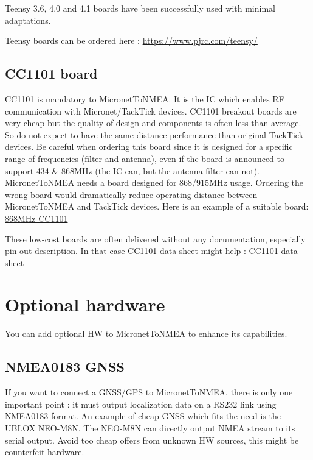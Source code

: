 \documentclass{report}
\begin{document}
Teensy 3.6, 4.0 and 4.1 boards have been successfully used with minimal adaptations.

Teensy boards can be ordered here : \url{https://www.pjrc.com/teensy/}

\subsection{CC1101 board}

CC1101 is mandatory to MicronetToNMEA. It is the IC which enables RF communication with Micronet/TackTick devices. CC1101 breakout boards are very cheap but the quality of design and components is often less than average. So do not expect to have the same distance performance than original TackTick devices. Be careful when ordering this board since it is designed for a specific range of frequencies (filter and antenna), even if the board is announced to support 434 \& 868MHz (the IC can, but the antenna filter can not). MicronetToNMEA needs a board designed for 868/915MHz usage. Ordering the wrong board would dramatically reduce operating distance between MicronetToNMEA and TackTick devices. Here is an example of a suitable board: \href{https://www.amazon.fr/laqiya-cc1101-868-MHz-Transmission-Antenne-Transceiver/dp/B075PFQ57G}{868MHz CC1101}

These low-cost boards are often delivered without any documentation, especially pin-out description. In that case CC1101 data-sheet might help : \href{https://www.ti.com/lit/ds/symlink/cc1101.pdf}{CC1101 data-sheet}

\section{Optional hardware}

You can add optional HW to MicronetToNMEA to enhance its capabilities.

\subsection{NMEA0183 GNSS}

If you want to connect a GNSS/GPS to MicronetToNMEA, there is only one important point : it must output localization data on a RS232 link using NMEA0183 format. An example of cheap GNSS which fits the need is the UBLOX NEO-M8N. The NEO-M8N can directly output NMEA stream to its serial output. Avoid too cheap offers from unknown HW sources, this might be counterfeit hardware.
\end{document}
